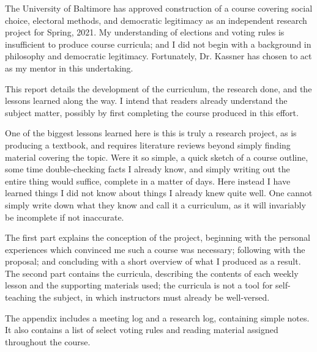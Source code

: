 
The University of Baltimore has approved construction of a course covering social choice, electoral methods, and democratic legitimacy as an independent research project for Spring, 2021.  My understanding of elections and voting rules is insufficient to produce course curricula; and I did not begin with a background in philosophy and democratic legitimacy.  Fortunately, Dr. Kassner has chosen to act as my mentor in this undertaking.

This report details the development of the curriculum, the research done, and the lessons learned along the way.  I intend that readers already understand the subject matter, possibly by first completing the course produced in this effort.

One of the biggest lessons learned here is this is truly a research project, as is producing a textbook, and requires literature reviews beyond simply finding material covering the topic.  Were it so simple, a quick sketch of a course outline, some time double-checking facts I already know, and simply writing out the entire thing would suffice, complete in a matter of days.  Here instead I have learned things I did not know about things I already knew quite well.  One cannot simply write down what they know and call it a curriculum, as it will invariably be incomplete if not inaccurate.

The first part explains the conception of the project, beginning with the personal experiences which convinced me such a course was necessary; following with the proposal; and concluding with a short overview of what I produced as a result.  The second part contains the curricula, describing the contents of each weekly lesson and the supporting materials used; the curricula is not a tool for self-teaching the subject, in which instructors must already be well-versed.

The appendix includes a meeting log and a research log, containing simple notes.  It also contains a list of select voting rules and reading material assigned throughout the course.
